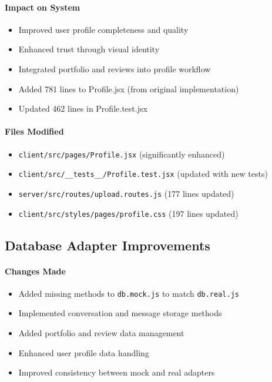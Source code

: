 \documentclass[11pt]{article}
\begin{document}
\paragraph{Impact on System}
\begin{itemize}[leftmargin=1.4em]
  \item Improved user profile completeness and quality
  \item Enhanced trust through visual identity
  \item Integrated portfolio and reviews into profile workflow
  \item Added 781 lines to Profile.jsx (from original implementation)
  \item Updated 462 lines in Profile.test.jsx
\end{itemize}

\paragraph{Files Modified}
\begin{itemize}[leftmargin=1.4em]
  \item \texttt{client/src/pages/Profile.jsx} (significantly enhanced)
  \item \texttt{client/src/\_\_tests\_\_/Profile.test.jsx} (updated with new tests)
  \item \texttt{server/src/routes/upload.routes.js} (177 lines updated)
  \item \texttt{client/src/styles/pages/profile.css} (197 lines updated)
\end{itemize}

\subsection{Database Adapter Improvements}
\paragraph{Changes Made}
\begin{itemize}[leftmargin=1.4em]
  \item Added missing methods to \texttt{db.mock.js} to match \texttt{db.real.js}
  \item Implemented conversation and message storage methods
  \item Added portfolio and review data management
  \item Enhanced user profile data handling
  \item Improved consistency between mock and real adapters
\end{itemize}
\end{document}
